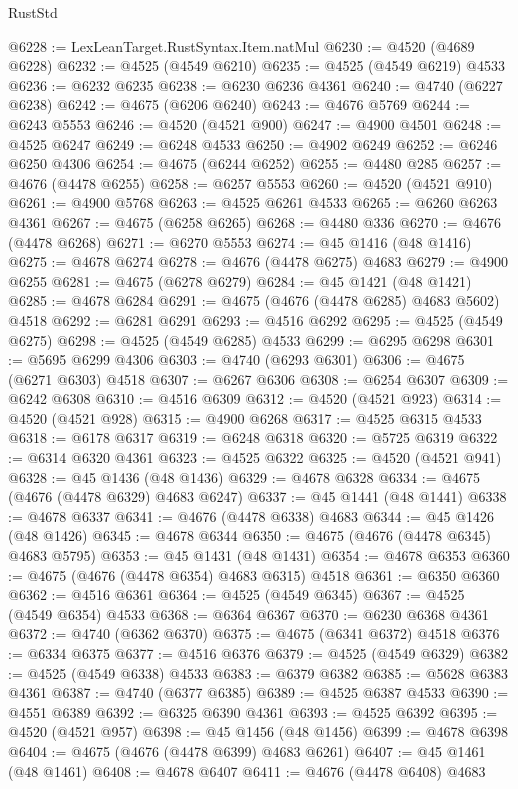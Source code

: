 \begin{lexlean}{RustStd}
\begin{coremodule}
{\begin{coremodule}
{{{{{{{{{{{{{{{{{{{{{{{{{{{{{{{{{{{{{{{{{{{{{{{{{{{{{{{{{{{{@6228 := LexLeanTarget.RustSyntax.Item.natMul
@6230 := @4520 (@4689 @6228)
@6232 := @4525 (@4549 @6210)
@6235 := @4525 (@4549 @6219) @4533
@6236 := @6232 @6235
@6238 := @6230 @6236 @4361
@6240 := @4740 (@6227 @6238)
@6242 := @4675 (@6206 @6240)
@6243 := @4676 @5769
@6244 := @6243 @5553
@6246 := @4520 (@4521 @900)
@6247 := @4900 @4501
@6248 := @4525 @6247
@6249 := @6248 @4533
@6250 := @4902 @6249
@6252 := @6246 @6250 @4306
@6254 := @4675 (@6244 @6252)
@6255 := @4480 @285
@6257 := @4676 (@4478 @6255)
@6258 := @6257 @5553
@6260 := @4520 (@4521 @910)
@6261 := @4900 @5768
@6263 := @4525 @6261 @4533
@6265 := @6260 @6263 @4361
@6267 := @4675 (@6258 @6265)
@6268 := @4480 @336
@6270 := @4676 (@4478 @6268)
@6271 := @6270 @5553
@6274 := @45 @1416 (@48 @1416)
@6275 := @4678 @6274
@6278 := @4676 (@4478 @6275) @4683
@6279 := @4900 @6255
@6281 := @4675 (@6278 @6279)
@6284 := @45 @1421 (@48 @1421)
@6285 := @4678 @6284
@6291 := @4675 (@4676 (@4478 @6285) @4683 @5602) @4518
@6292 := @6281 @6291
@6293 := @4516 @6292
@6295 := @4525 (@4549 @6275)
@6298 := @4525 (@4549 @6285) @4533
@6299 := @6295 @6298
@6301 := @5695 @6299 @4306
@6303 := @4740 (@6293 @6301)
@6306 := @4675 (@6271 @6303) @4518
@6307 := @6267 @6306
@6308 := @6254 @6307
@6309 := @6242 @6308
@6310 := @4516 @6309
@6312 := @4520 (@4521 @923)
@6314 := @4520 (@4521 @928)
@6315 := @4900 @6268
@6317 := @4525 @6315 @4533
@6318 := @6178 @6317
@6319 := @6248 @6318
@6320 := @5725 @6319
@6322 := @6314 @6320 @4361
@6323 := @4525 @6322
@6325 := @4520 (@4521 @941)
@6328 := @45 @1436 (@48 @1436)
@6329 := @4678 @6328
@6334 := @4675 (@4676 (@4478 @6329) @4683 @6247)
@6337 := @45 @1441 (@48 @1441)
@6338 := @4678 @6337
@6341 := @4676 (@4478 @6338) @4683
@6344 := @45 @1426 (@48 @1426)
@6345 := @4678 @6344
@6350 := @4675 (@4676 (@4478 @6345) @4683 @5795)
@6353 := @45 @1431 (@48 @1431)
@6354 := @4678 @6353
@6360 := @4675 (@4676 (@4478 @6354) @4683 @6315) @4518
@6361 := @6350 @6360
@6362 := @4516 @6361
@6364 := @4525 (@4549 @6345)
@6367 := @4525 (@4549 @6354) @4533
@6368 := @6364 @6367
@6370 := @6230 @6368 @4361
@6372 := @4740 (@6362 @6370)
@6375 := @4675 (@6341 @6372) @4518
@6376 := @6334 @6375
@6377 := @4516 @6376
@6379 := @4525 (@4549 @6329)
@6382 := @4525 (@4549 @6338) @4533
@6383 := @6379 @6382
@6385 := @5628 @6383 @4361
@6387 := @4740 (@6377 @6385)
@6389 := @4525 @6387 @4533
@6390 := @4551 @6389
@6392 := @6325 @6390 @4361
@6393 := @4525 @6392
@6395 := @4520 (@4521 @957)
@6398 := @45 @1456 (@48 @1456)
@6399 := @4678 @6398
@6404 := @4675 (@4676 (@4478 @6399) @4683 @6261)
@6407 := @45 @1461 (@48 @1461)
@6408 := @4678 @6407
@6411 := @4676 (@4478 @6408) @4683
}}}}}}}}}}}}}}}}}}}}}}}}}}}}}}}}}}}}}}}}}}}}}}}}}}}}}}}}}}}}
\end{coremodule}}
\end{coremodule}
\end{lexlean}
